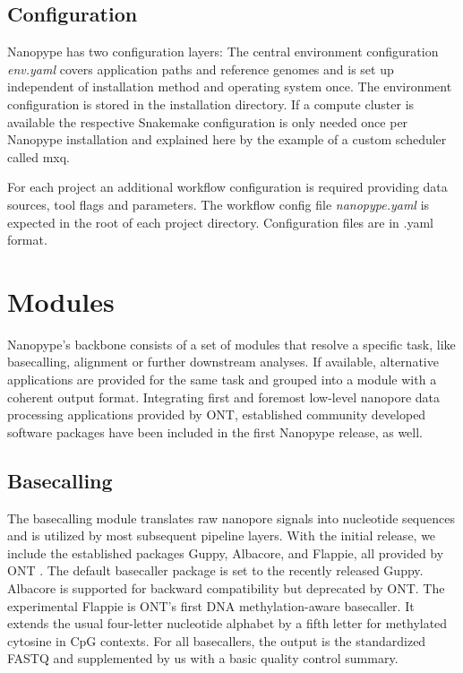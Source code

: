 \subsection{Configuration}

Nanopype has two configuration layers: The central environment configuration \textit{env.yaml} covers application paths and reference genomes and is set up independent of installation method and operating system once. The environment configuration is stored in the installation directory. If a compute cluster is available the respective Snakemake configuration is only needed once per Nanopype installation and explained here by the example of a custom scheduler called mxq.

For each project an additional workflow configuration is required providing data sources, tool flags and parameters. The workflow config file \textit{nanopype.yaml} is expected in the root of each project directory. Configuration files are in .yaml format.






\section{Modules}
\label{sec:nanopype:modules}
Nanopype’s backbone consists of a set of modules that resolve a specific task, like basecalling, alignment or further downstream analyses. If available, alternative applications are provided for the same task and grouped into a module with a coherent output format. Integrating first and foremost low-level nanopore data processing applications provided by ONT, established community developed software packages have been included in the first Nanopype release, as well.


\subsection{Basecalling}
\label{subsec:nanopype:basecalling}
The basecalling module translates raw nanopore signals into nucleotide sequences and is utilized by most subsequent pipeline layers. With the initial release, we include the established packages Guppy, Albacore, and Flappie, all provided by ONT \cite{Wick2019}. The default basecaller package is set to the recently released Guppy. Albacore is supported for backward compatibility but deprecated by ONT. The experimental Flappie is ONT’s first DNA methylation-aware basecaller. It extends the usual four-letter nucleotide alphabet by a fifth letter for methylated cytosine in CpG contexts. For all basecallers, the output is the standardized FASTQ and supplemented by us with a basic quality control summary.


